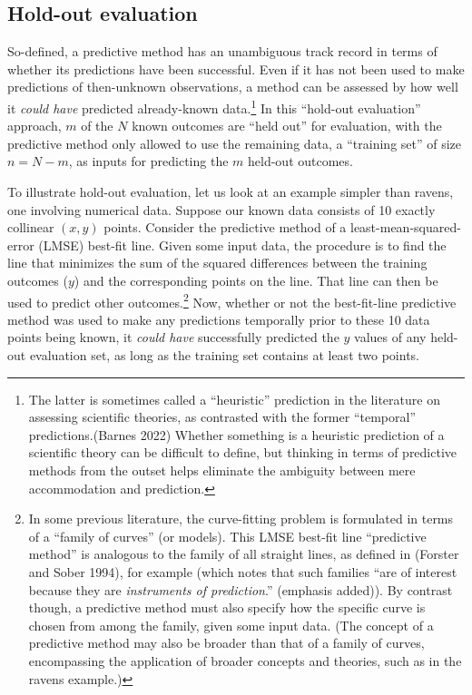 \documentclass[
  letterpaper,
  DIV=11,
  numbers=noendperiod]{scrartcl}
\theoremstyle{definition}
\theoremstyle{remark}
\begin{document}
\subsection{Hold-out evaluation}\label{hold-out-evaluation}

So-defined, a predictive method has an unambiguous track record in terms
of whether its predictions have been successful. Even if it has not been
used to make predictions of then-unknown observations, a method can be
assessed by how well it \emph{could have} predicted already-known
data.\footnote{The latter is sometimes called a ``heuristic'' prediction
  in the literature on assessing scientific theories, as contrasted with
  the former ``temporal'' predictions.(Barnes 2022) Whether something is
  a heuristic prediction of a scientific theory can be difficult to
  define, but thinking in terms of predictive methods from the outset
  helps eliminate the ambiguity between mere accommodation and
  prediction.} In this ``hold-out evaluation'' approach, \(m\) of the
\(N\) known outcomes are ``held out'' for evaluation, with the
predictive method only allowed to use the remaining data, a ``training
set'' of size \(n=N-m\), as inputs for predicting the \(m\) held-out
outcomes.

To illustrate hold-out evaluation, let us look at an example simpler
than ravens, one involving numerical data. Suppose our known data
consists of 10 exactly collinear \((x, y)\) points. Consider the
predictive method of a least-mean-squared-error (LMSE) best-fit line.
Given some input data, the procedure is to find the line that minimizes
the sum of the squared differences between the training outcomes (\(y\))
and the corresponding points on the line. That line can then be used to
predict other outcomes.\footnote{In some previous literature, the
  curve-fitting problem is formulated in terms of a ``family of curves''
  (or models). This LMSE best-fit line ``predictive method'' is
  analogous to the family of all straight lines, as defined in (Forster
  and Sober 1994), for example (which notes that such families ``are of
  interest because they are \emph{instruments of prediction}.''
  (emphasis added)). By contrast though, a predictive method must also
  specify how the specific curve is chosen from among the family, given
  some input data. (The concept of a predictive method may also be
  broader than that of a family of curves, encompassing the application
  of broader concepts and theories, such as in the ravens example.)}
Now, whether or not the best-fit-line predictive method was used to make
any predictions temporally prior to these 10 data points being known, it
\emph{could have} successfully predicted the \(y\) values of any
held-out evaluation set, as long as the training set contains at least
two points.
\end{document}
